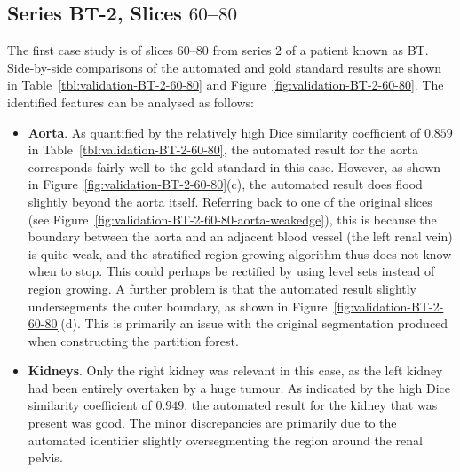 \subsection{Series BT-2, Slices $60$--$80$}

The first case study is of slices $60$--$80$ from series $2$ of a patient known as BT. Side-by-side comparisons of the automated and gold standard results are shown in Table~\ref{tbl:validation-BT-2-60-80} and Figure~\ref{fig:validation-BT-2-60-80}. The identified features can be analysed as follows:
%
\begin{itemize}

\item \textbf{Aorta}. As quantified by the relatively high Dice similarity coefficient of $0.859$ in Table~\ref{tbl:validation-BT-2-60-80}, the automated result for the aorta corresponds fairly well to the gold standard in this case. However, as shown in Figure~\ref{fig:validation-BT-2-60-80}(c), the automated result does flood slightly beyond the aorta itself. Referring back to one of the original slices (see Figure~\ref{fig:validation-BT-2-60-80-aorta-weakedge}), this is because the boundary between the aorta and an adjacent blood vessel (the left renal vein) is quite weak, and the stratified region growing algorithm thus does not know when to stop. This could perhaps be rectified by using level sets instead of region growing. A further problem is that the automated result slightly undersegments the outer boundary, as shown in Figure~\ref{fig:validation-BT-2-60-80}(d). This is primarily an issue with the original segmentation produced when constructing the partition forest.

\item \textbf{Kidneys}. Only the right kidney was relevant in this case, as the left kidney had been entirely overtaken by a huge tumour. As indicated by the high Dice similarity coefficient of $0.949$, the automated result for the kidney that was present was good. The minor discrepancies are primarily due to the automated identifier slightly oversegmenting the region around the renal pelvis.


\end{itemize}
